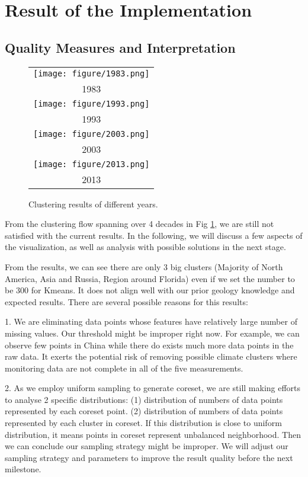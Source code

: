 \section{Result of the Implementation}
\subsection{Quality Measures and Interpretation}
\begin{figure}
    \centering
    \begin{tabular}{c}
        \texttt{[image: figure/1983.png]}\\         1983 \\
        \texttt{[image: figure/1993.png]} \\
        1993 \\
        \texttt{[image: figure/2003.png]} \\         2003 \\
        \texttt{[image: figure/2013.png]} \\
        2013\\
    \end{tabular}
    \caption{Clustering results of different years.}
    \label{fig:ClusteringFlow}
\end{figure}

From the clustering flow spanning over 4 decades in Fig \ref{fig:ClusteringFlow}, we are still not satisfied with the current results. In the following, we will discuss a few aspects of the visualization, as well as analysis with possible solutions in the next stage.

From the results, we can see there are only 3 big clusters (Majority of North America, Asia and Russia, Region around Florida) even if we set the number to be 300 for Kmeans. It does not align well with our prior geology knowledge and expected results. There are several possible reasons for this results:

1. We are eliminating data points whose features have relatively large number of missing values. Our threshold might be improper right now. For example, we can observe few points in China while there do exists much more data points in the raw data. It exerts the potential risk of removing possible climate clusters where monitoring data are not complete in all of the five measurements.

2. As we employ uniform sampling to generate coreset, we are still making efforts to analyse 2 specific distributions: (1) distribution of  numbers of data points represented by each coreset point. (2) distribution of numbers of data points represented by each cluster in coreset. If this distribution is close to uniform distribution, it means points in coreset represent unbalanced neighborhood. Then we can conclude our sampling strategy might be improper. We will adjust our sampling strategy and parameters to improve the result quality before the next milestone.

